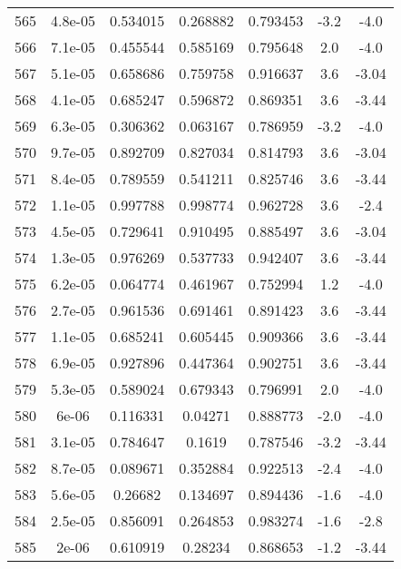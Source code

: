 \begin{table}
\begin{tabular}{c|c|c|c|c|c|c}
565 & 4.8e-05 & 0.534015 & 0.268882 & 0.793453 & -3.2 & -4.0\\
566 & 7.1e-05 & 0.455544 & 0.585169 & 0.795648 & 2.0 & -4.0\\
567 & 5.1e-05 & 0.658686 & 0.759758 & 0.916637 & 3.6 & -3.04\\
568 & 4.1e-05 & 0.685247 & 0.596872 & 0.869351 & 3.6 & -3.44\\
569 & 6.3e-05 & 0.306362 & 0.063167 & 0.786959 & -3.2 & -4.0\\
570 & 9.7e-05 & 0.892709 & 0.827034 & 0.814793 & 3.6 & -3.04\\
571 & 8.4e-05 & 0.789559 & 0.541211 & 0.825746 & 3.6 & -3.44\\
572 & 1.1e-05 & 0.997788 & 0.998774 & 0.962728 & 3.6 & -2.4\\
573 & 4.5e-05 & 0.729641 & 0.910495 & 0.885497 & 3.6 & -3.04\\
574 & 1.3e-05 & 0.976269 & 0.537733 & 0.942407 & 3.6 & -3.44\\
575 & 6.2e-05 & 0.064774 & 0.461967 & 0.752994 & 1.2 & -4.0\\
576 & 2.7e-05 & 0.961536 & 0.691461 & 0.891423 & 3.6 & -3.44\\
577 & 1.1e-05 & 0.685241 & 0.605445 & 0.909366 & 3.6 & -3.44\\
578 & 6.9e-05 & 0.927896 & 0.447364 & 0.902751 & 3.6 & -3.44\\
579 & 5.3e-05 & 0.589024 & 0.679343 & 0.796991 & 2.0 & -4.0\\
580 & 6e-06 & 0.116331 & 0.04271 & 0.888773 & -2.0 & -4.0\\
581 & 3.1e-05 & 0.784647 & 0.1619 & 0.787546 & -3.2 & -3.44\\
582 & 8.7e-05 & 0.089671 & 0.352884 & 0.922513 & -2.4 & -4.0\\
583 & 5.6e-05 & 0.26682 & 0.134697 & 0.894436 & -1.6 & -4.0\\
584 & 2.5e-05 & 0.856091 & 0.264853 & 0.983274 & -1.6 & -2.8\\
585 & 2e-06 & 0.610919 & 0.28234 & 0.868653 & -1.2 & -3.44\\
\end{tabular}
\end{table}
\newpage
